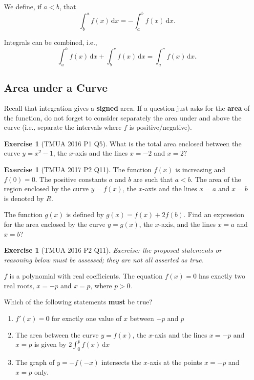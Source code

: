 \documentclass[11pt]{article}
\theoremstyle{definition}
\newtheorem{example}[theorem]{Exercise}
\theoremstyle{remark}
\newcommand{\pqty}[1]{\left(#1\right)}
\newcommand{\dd}[1]{\,\mathrm{d}#1}
\begin{document}
We define, if \(a < b\), that
\[
    \int_{b}^{a} f\pqty{x} \dd{x} = - \int_{a}^{b} f\pqty{x} \dd{x}.
\]

Integrals can be combined, i.e.,
\[
    \int_{a}^{b} f\pqty{x} \dd{x} + \int_{b}^{c} f\pqty{x} \dd{x} = \int_{a}^{c} f\pqty{x} \dd{x}.
\]

\subsection{Area under a Curve}\label{tmua-4-subsection-010}

Recall that integration gives a \textbf{signed} area. If a question just asks for the \textbf{area} of the function, do not forget to consider separately the area under and above the curve (i.e., separate the intervals where \(f\) is positive/negative).

\begin{example}[TMUA 2016 P1 Q5]\label{tmua-4-unit-027}
    What is the total area enclosed between the curve \(y = x^2 - 1\), the \(x\)-axis and the lines \(x = -2\) and \(x = 2\)?
\end{example}

\begin{example}[TMUA 2017 P2 Q11]\label{tmua-4-unit-028}
    The function \(f\pqty{x}\) is increasing and \(f\pqty{0} = 0\). The positive constants \(a\) and \(b\) are such that \(a < b\). The area of the region enclosed by the curve \(y = f\pqty{x}\), the \(x\)-axis and the lines \(x = a\) and \(x = b\) is denoted by \(R\).

    The function \(g\pqty{x}\) is defined by \(g\pqty{x} = f\pqty{x} + 2 f\pqty{b}\). Find an expression for the area enclosed by the curve \(y = g\pqty{x}\), the \(x\)-axis, and the lines \(x = a\) and \(x = b\)?
\end{example}

\begin{example}[TMUA 2016 P2 Q11]\label{tmua-4-unit-029}
\textit{Exercise: the proposed statements or reasoning below must be assessed; they are not all asserted as true.}\par

    \(f\) is a polynomial with real coefficients. The equation \(f\pqty{x} = 0\) has exactly two real roots, \(x = -p\) and \(x = p\), where \(p > 0\).

    Which of the following statements \textbf{must} be true?

    \begin{enumerate}[label=\Roman*.]
        \item \(f'\pqty{x} = 0\) for exactly one value of \(x\) between \(-p\) and \(p\)
        \item The area between the curve \(y = f\pqty{x}\), the \(x\)-axis and the lines \(x = -p\) and \(x = p\) is given by \(2 \int_{0}^{p} f\pqty{x} \dd{x}\)
        \item The graph of \(y = - f\pqty{-x}\) intersects the \(x\)-axis at the points \(x = -p\) and \(x = p\) only.
    \end{enumerate}
\end{example}
\end{document}
